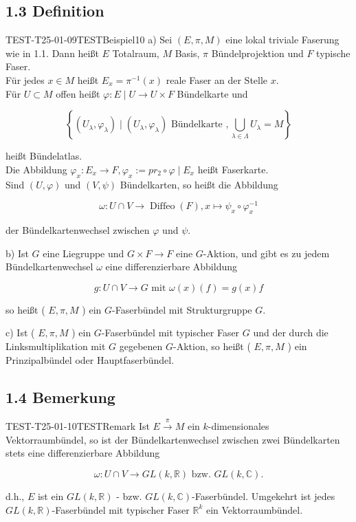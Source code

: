\subsection*{1.3 Definition}
\begin{DEF}{TEST-T25-01-09}{TESTBeispiel10}
a) Sei $(E, \pi, M)$ eine lokal triviale Faserung wie in 1.1. Dann heißt $E$ Totalraum, $M$ Basis, $\pi$ Bündelprojektion und $F$ typische Faser.\\
Für jedes $x \in M$ heißt $E_{x}=\pi^{-1}(x)$ reale Faser an der Stelle $x$.\\
Für $U \subset M$ offen heißt $\varphi: E \mid U \rightarrow U \times F$ Bündelkarte und

$$
\left\{\left(U_{\lambda}, \varphi_{\lambda}\right) \mid\left(U_{\lambda}, \varphi_{\lambda}\right) \text { Bündelkarte }, \bigcup_{\lambda \in \Lambda} U_{\lambda}=M\right\}
$$

heißt Bündelatlas.\\
Die Abbildung $\varphi_{x}: E_{x} \rightarrow F, \varphi_{x}:=p r_{2} \circ \varphi \mid E_{x}$ heißt Faserkarte.\\
Sind $(U, \varphi)$ und $(V, \psi)$ Bündelkarten, so heißt die Abbildung

$$
\omega: U \cap V \rightarrow \operatorname{Diffeo}(F), x \mapsto \psi_{x} \circ \varphi_{x}^{-1}
$$

der Bündelkartenwechsel zwischen $\varphi$ und $\psi$.

b) Ist $G$ eine Liegruppe und $G \times F \rightarrow F$ eine $G$-Aktion, und gibt es zu jedem Bündelkartenwechsel $\omega$ eine differenzierbare Abbildung

$$
g: U \cap V \rightarrow G \text { mit } \omega(x)(f)=g(x) f
$$

so heißt ( $E, \pi, M$ ) ein $G$-Faserbündel mit Strukturgruppe $G$.

c) Ist ( $E, \pi, M$ ) ein $G$-Faserbündel mit typischer Faser $G$ und der durch die Linksmultiplikation mit $G$ gegebenen $G$-Aktion, so heißt ( $E, \pi, M$ ) ein Prinzipalbündel oder Hauptfaserbündel.
\end{DEF}

\subsection*{1.4 Bemerkung}
\begin{REM}{TEST-T25-01-10}{TESTRemark}
Ist $E \xrightarrow{\pi} M$ ein $k$-dimensionales Vektorraumbündel, so ist der Bündelkartenwechsel zwischen zwei Bündelkarten stets eine differenzierbare Abbildung

$$
\omega: U \cap V \rightarrow G L(k, \mathbb{R}) \text { bzw. } G L(k, \mathbb{C}) .
$$

d.h., $E$ ist ein $G L(k, \mathbb{R})$ - bzw. $G L(k, \mathbb{C})$-Faserbündel. Umgekehrt ist jedes $G L(k, \mathbb{R})$-Faserbündel mit typischer Faser $\mathbb{R}^{k}$ ein Vektorraumbündel.
\end{REM}

